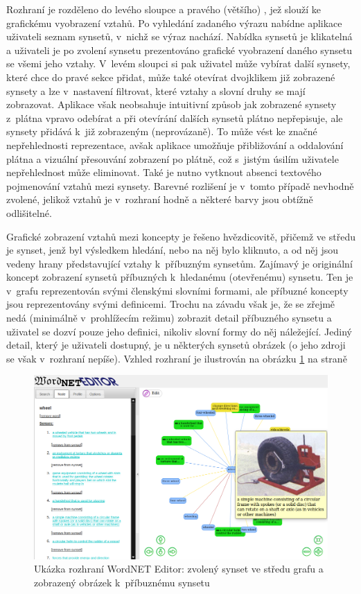 \documentclass[a4paper, 11pt, oneside, showtrims]{book}
\begin{document}
					Rozhraní je rozděleno do levého sloupce a pravého (většího) , jež slouží ke grafickému vyobrazení vztahů. Po vyhledání zadaného výrazu nabídne aplikace uživateli seznam synsetů, v~nichž se výraz nachází. Nabídka synsetů je klikatelná a uživateli je po zvolení synsetu prezentováno grafické vyobrazení daného synsetu se všemi jeho vztahy. V~levém sloupci si pak uživatel může vybírat další synsety, které chce do pravé sekce přidat, může také otevírat dvojklikem již zobrazené synsety a lze v~nastavení filtrovat, které vztahy a slovní druhy se mají zobrazovat. Aplikace však neobsahuje intuitivní způsob jak zobrazené synsety z~plátna vpravo odebírat a při otevírání dalších synsetů plátno nepřepisuje, ale synsety přidává k~již zobrazeným (neprovázaně). To může vést ke značné nepřehlednosti reprezentace, avšak aplikace umožňuje přibližování a oddalování plátna a vizuální přesouvání zobrazení po plátně, což s~jistým úsilím uživatele nepřehlednost může eliminovat. Také je nutno vytknout absenci textového pojmenování vztahů mezi synsety. Barevné rozlišení je v~tomto případě nevhodně zvolené, jelikož vztahů je v~rozhraní hodně a některé barvy jsou obtížně odlišitelné.

					Grafické zobrazení vztahů mezi koncepty je řešeno hvězdicovitě, přičemž ve středu je synset, jenž byl výsledkem hledání, nebo na něj bylo kliknuto, a od něj jsou vedeny hrany představující vztahy k~příbuzným synsetům. Zajímavý je originální koncept zobrazení synsetů příbuzných k~hledanému (otevřenému) synsetu. Ten je v~grafu reprezentován svými členskými slovními formami, ale příbuzné koncepty jsou reprezentovány svými definicemi. Trochu na závadu však je, že se zřejmě nedá (minimálně v~prohlížecím režimu) zobrazit detail příbuzného synsetu a uživatel se dozví pouze jeho definici, nikoliv slovní formy do něj náležející. Jediný detail, který je uživateli dostupný, je u některých synsetů obrázek (o jeho zdroji se však v~rozhraní nepíše). Vzhled rozhraní je ilustrován na obrázku \ref{fig:wneditor} na straně \pageref{fig:wneditor}

					\begin{figure}[h]
						\centering
						\includegraphics[width=1.0\textwidth]{wneditor.png}
						\caption{Ukázka rozhraní WordNET Editor: zvolený synset ve středu grafu a zobrazený obrázek k~příbuznému synsetu}
						\label{fig:wneditor}
					\end{figure}
\end{document}
